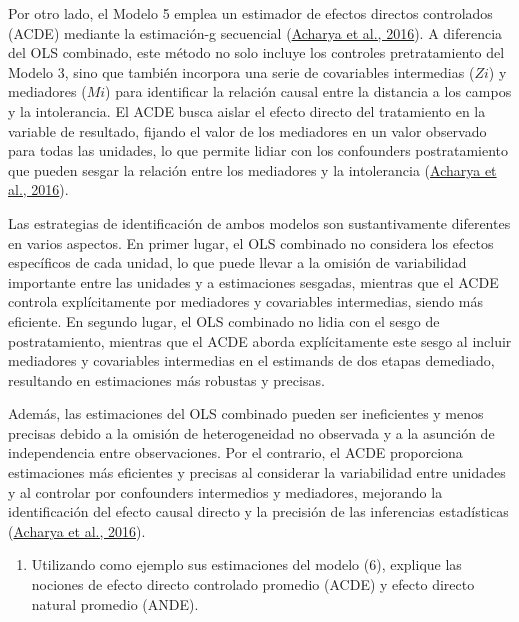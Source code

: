 \documentclass[
  12pt,
  a4paper,
]{article}
\providecommand{\tightlist}{%
  \setlength{\itemsep}{0pt}\setlength{\parskip}{0pt}}
\begin{document}
Por otro lado, el Modelo 5 emplea un estimador de efectos directos controlados (ACDE) mediante la estimación-g secuencial (\protect\hyperlink{ref-acharya_explaining_2016}{Acharya et al., 2016}). A diferencia del OLS combinado, este método no solo incluye los controles pretratamiento del Modelo 3, sino que también incorpora una serie de covariables intermedias (\(Zi\)) y mediadores (\(Mi\)) para identificar la relación causal entre la distancia a los campos y la intolerancia. El ACDE busca aislar el efecto directo del tratamiento en la variable de resultado, fijando el valor de los mediadores en un valor observado para todas las unidades, lo que permite lidiar con los confounders postratamiento que pueden sesgar la relación entre los mediadores y la intolerancia (\protect\hyperlink{ref-acharya_explaining_2016}{Acharya et al., 2016}).

Las estrategias de identificación de ambos modelos son sustantivamente diferentes en varios aspectos. En primer lugar, el OLS combinado no considera los efectos específicos de cada unidad, lo que puede llevar a la omisión de variabilidad importante entre las unidades y a estimaciones sesgadas, mientras que el ACDE controla explícitamente por mediadores y covariables intermedias, siendo más eficiente. En segundo lugar, el OLS combinado no lidia con el sesgo de postratamiento, mientras que el ACDE aborda explícitamente este sesgo al incluir mediadores y covariables intermedias en el estimands de dos etapas demediado, resultando en estimaciones más robustas y precisas.

Además, las estimaciones del OLS combinado pueden ser ineficientes y menos precisas debido a la omisión de heterogeneidad no observada y a la asunción de independencia entre observaciones. Por el contrario, el ACDE proporciona estimaciones más eficientes y precisas al considerar la variabilidad entre unidades y al controlar por confounders intermedios y mediadores, mejorando la identificación del efecto causal directo y la precisión de las inferencias estadísticas (\protect\hyperlink{ref-acharya_explaining_2016}{Acharya et al., 2016}).

\begin{enumerate}
\def\labelenumi{\alph{enumi})}
\setcounter{enumi}{2}
\tightlist
\item
  Utilizando como ejemplo sus estimaciones del modelo (6), explique las nociones de efecto directo controlado promedio (ACDE) y efecto directo natural promedio (ANDE).
\end{enumerate}
\end{document}
